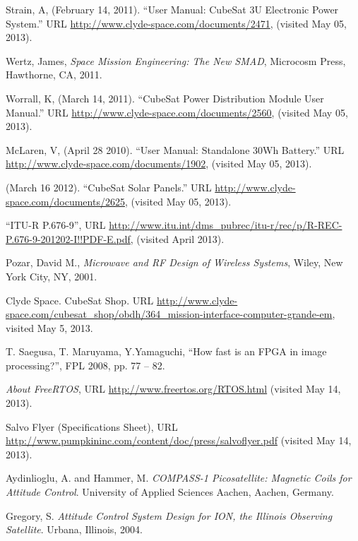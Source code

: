 \documentclass[12pt]{article}
\begin{document}
\begin{thebibliography}{99}
 Strain, A, (February 14, 2011).  ``User Manual: CubeSat 3U Electronic Power System.'' URL \url{http://www.clyde-space.com/documents/2471}, (visited May 05, 2013).

Wertz, James, \emph{Space Mission Engineering: The New SMAD}, Microcosm Press, Hawthorne, CA, 2011.

 Worrall, K, (March 14, 2011).  ``CubeSat Power Distribution Module User Manual.'' URL \url{http://www.clyde-space.com/documents/2560}, (visited May 05, 2013).

 McLaren, V, (April 28 2010).  ``User Manual: Standalone 30Wh Battery.''  URL \url{http://www.clyde-space.com/documents/1902}, (visited May 05, 2013).

 (March 16 2012). ``CubeSat Solar Panels.''  URL \url{http://www.clyde-space.com/documents/2625}, (visited May 05, 2013).


``ITU-R P.676-9'', URL \url{http://www.itu.int/dms_pubrec/itu-r/rec/p/R-REC-P.676-9-201202-I!!PDF-E.pdf}, (visited April 2013).

Pozar, David M., \emph{Microwave and RF Design of Wireless Systems}, Wiley, New York City, NY, 2001.



Clyde Space. CubeSat Shop. URL \url{http://www.clyde-space.com/cubesat_shop/obdh/364_mission-interface-computer-grande-em}, visited May 5, 2013. 

T. Saegusa, T. Maruyama, Y.Yamaguchi, ``How fast is an FPGA in image processing?'', FPL 2008, pp. 77 – 82.

\emph{About FreeRTOS}, URL \url{http://www.freertos.org/RTOS.html} (visited May 14, 2013).

Salvo Flyer (Specifications Sheet), URL \url{http://www.pumpkininc.com/content/doc/press/salvoflyer.pdf} (visited May 14, 2013).


Aydinlioglu, A. and Hammer, M. \emph{COMPASS-1 Picosatellite: Magnetic Coils for Attitude Control}. University of Applied Sciences Aachen, Aachen, Germany. 

Gregory, S. \emph{Attitude Control System Design for ION, the Illinois Observing Satellite}. Urbana, Illinois, 2004.


\end{thebibliography}
\end{document}
